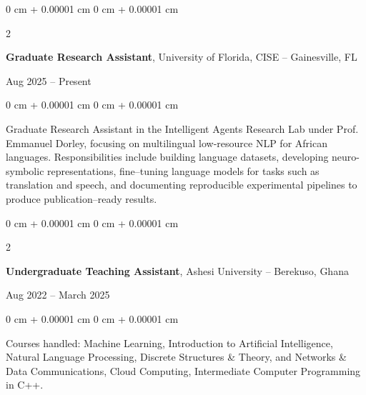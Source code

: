 \documentclass[10pt, letterpaper]{article}
\newenvironment{highlights}{
    \begin{itemize}[
        topsep=0.10 cm,
        parsep=0.10 cm,
        partopsep=0pt,
        itemsep=0pt,
        leftmargin=0 cm + 10pt
    ]
}{
    \end{itemize}
} %
\newenvironment{onecolentry}{
    \begin{adjustwidth}{
        0 cm + 0.00001 cm
    }{
        0 cm + 0.00001 cm
    }
}{
    \end{adjustwidth}
} %
\newenvironment{twocolentry}[2][]{
    \onecolentry
    \def\secondColumn{#2}
    \setcolumnwidth{\fill, 4.5 cm}
    \begin{paracol}{2}
}{
    \switchcolumn \raggedleft \secondColumn
    \end{paracol}
    \endonecolentry
} %
\begin{document}
        \begin{twocolentry}{
            Aug 2025 – Present
        }
            \textbf{Graduate Research Assistant}, University of Florida, CISE -- Gainesville, FL
        \end{twocolentry}
        \vspace{0.10 cm}
        \begin{onecolentry}
            \begin{highlights}
                Graduate Research Assistant in the Intelligent Agents Research Lab under Prof. Emmanuel Dorley, focusing on multilingual low-resource NLP for African languages. Responsibilities include building language datasets, developing neuro-symbolic representations, fine--tuning language models for tasks such as translation and speech, and documenting reproducible experimental pipelines to produce publication--ready results.
            \end{highlights}
        \end{onecolentry}


        \vspace{0.2 cm}

        \begin{twocolentry}{
            Aug 2022 – March 2025
        }
            \textbf{Undergraduate Teaching Assistant}, Ashesi University -- Berekuso, Ghana
        \end{twocolentry}
        \vspace{0.10 cm}
        \begin{onecolentry}
            \begin{highlights}
                 Courses handled: Machine Learning, Introduction to Artificial Intelligence, Natural Language Processing, Discrete Structures \& Theory, and Networks \& Data Communications, Cloud Computing, Intermediate Computer Programming in C++.
            \end{highlights}
        \end{onecolentry}

        \vspace{0.2cm}

\end{document}
